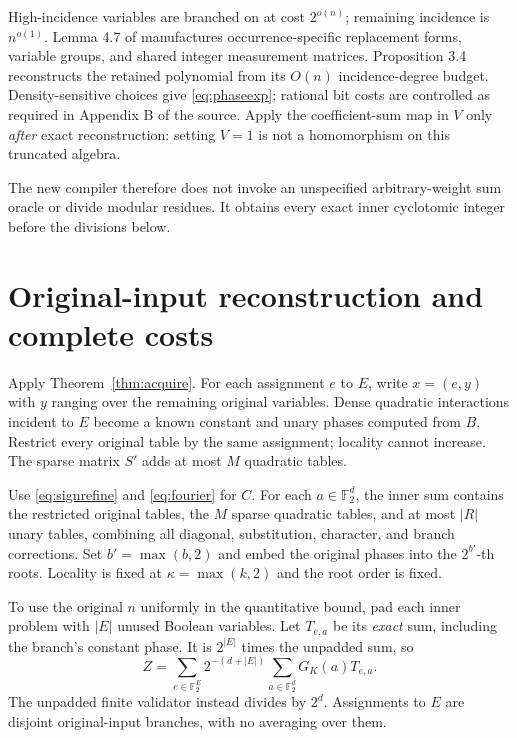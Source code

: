 \documentclass[11pt,a4paper]{article}
\theoremstyle{remark}\newtheorem{remark}[theorem]{Remark}
\newcommand{\F}{\mathbb F}\newcommand{\Z}{\mathbb Z}\newcommand{\Q}{\mathbb Q}
\begin{document}
High-incidence variables are branched on at cost $2^{o(n)}$;
remaining incidence is $n^{o(1)}$. Lemma 4.7 of
\cite{governing} manufactures occurrence-specific replacement
forms, variable groups, and shared integer measurement matrices.
Proposition 3.4 reconstructs the retained polynomial from its
$O(n)$ incidence-degree budget. Density-sensitive choices
give \eqref{eq:phaseexp}; rational bit costs are controlled
as required in Appendix B of the source. Apply the
coefficient-sum map in $V$ only \emph{after} exact
reconstruction: setting $V=1$ is not a homomorphism on this
truncated algebra.

The new compiler therefore does not invoke an unspecified
arbitrary-weight sum oracle or divide modular residues.
It obtains every exact inner cyclotomic integer before the
divisions below.

\section{Original-input reconstruction and complete costs}
\label{sec:cost}
Apply Theorem~\ref{thm:acquire}. For each assignment $e$ to
$E$, write $x=(e,y)$ with $y$ ranging over the remaining
original variables. Dense quadratic interactions incident
to $E$ become a known constant and unary phases computed
from $B$. Restrict every original table by the same assignment;
locality cannot increase. The sparse matrix $S'$ adds at most
$M$ quadratic tables.

Use \eqref{eq:signrefine} and \eqref{eq:fourier} for $C$.
For each $a\in\F_2^d$, the inner sum contains the restricted
original tables, the $M$ sparse quadratic tables, and at most
$|R|$ unary tables, combining all diagonal, substitution,
character, and branch corrections. Set $b'=\max(b,2)$ and
embed the original phases into the $2^{b'}$-th roots.
Locality is fixed at $\kappa=\max(k,2)$ and the root order
is fixed.

To use the original $n$ uniformly in the quantitative bound,
pad each inner problem with $|E|$ unused Boolean variables.
Let $T_{e,a}$ be its \emph{exact} sum, including the branch's
constant phase. It is $2^{|E|}$ times the unpadded sum, so
\begin{equation}\label{eq:finalreconstruction}
Z=\sum_{e\in\F_2^E}
  2^{-(d+|E|)}\sum_{a\in\F_2^d}G_K(a)T_{e,a}.
\end{equation}
The unpadded finite validator instead divides by $2^d$.
Assignments to $E$ are disjoint original-input branches,
with no averaging over them.
\end{document}
